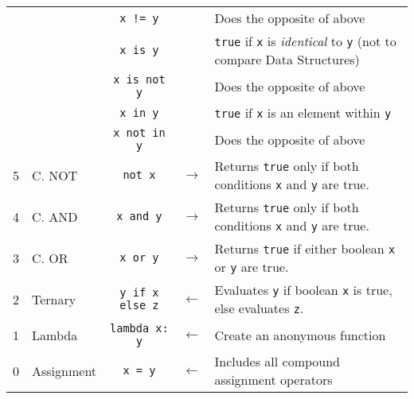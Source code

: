 \documentclass{article}
\begin{document}
\begin{center}
\begin{tabularx}{\textwidth}{clccX}
                    & & \lstinline|x != y|    &  & Does the opposite of above\\
                    & & \lstinline|x is y| & & \lstinline|true| if \lstinline|x| is \textit{identical} to \lstinline|y| (not to compare Data Structures)\\
                    & & \lstinline|x is not y| & & Does the opposite of above\\
                    & & \lstinline|x in y| & & \lstinline|true| if \lstinline|x| is an element within \lstinline|y|\\
                    & & \lstinline|x not in y| & & Does the opposite of above\\\midrule
                  5 & C. NOT            & \lstinline|not x|  & \(\to\) & Returns \lstinline|true| only if both conditions \lstinline|x| and \lstinline|y| are true.\\\midrule
                  4 & C. AND            & \lstinline|x and y|& \(\to\) & Returns \lstinline|true| only if both conditions \lstinline|x| and \lstinline|y| are true.\\\midrule
                  3 & C. OR             & \lstinline|x or y| & \(\to\) & Returns \lstinline|true| if either boolean \lstinline|x| or \lstinline|y| are true.\\\midrule
                  2 & Ternary           & \lstinline|y if x else z| & \(\gets\) & Evaluates \lstinline|y| if boolean \lstinline|x| is true, else evaluates \lstinline|z|.\\\midrule
                  1 & Lambda            & \lstinline|lambda x: y| & \(\gets\) & Create an anonymous function\\\midrule
                  0 & Assignment        & \lstinline|x = y| & \(\gets\) & Includes all compound assignment operators\\\midrule
\end{tabularx}\end{center}
\end{document}
